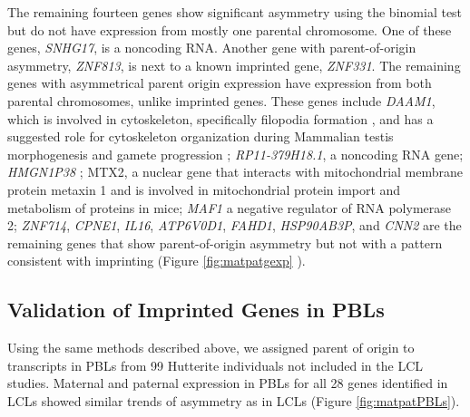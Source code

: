 The remaining fourteen genes show significant asymmetry using the binomial test but do not have expression from mostly one parental chromosome. One of these genes, \emph{SNHG17}, is a noncoding RNA. Another gene with parent-of-origin asymmetry,  \emph{ZNF813}, is next to a known imprinted gene, \emph{ZNF331}. The remaining genes with asymmetrical parent origin expression have expression from both parental chromosomes, unlike imprinted genes. These genes include  \emph{DAAM1},  which is involved in cytoskeleton, specifically filopodia formation \citep{Hoffmann:2014ki, Luo:2016db}, and has a suggested role for cytoskeleton organization during Mammalian testis morphogenesis and gamete progression \citep{Pariante:2016kn};  \emph{RP11-379H18.1}, a noncoding RNA gene;  \emph{HMGN1P38} \citep{StrichmanAlmashanu:2003cw}; MTX2, a nuclear gene that interacts with mitochondrial membrane protein metaxin 1 and is involved in mitochondrial protein import and metabolism of proteins in mice;   \emph{MAF1} a negative regulator of RNA polymerase 2;  \emph{ZNF714},  \emph{CPNE1},  \emph{IL16},  \emph{ATP6V0D1},  \emph{FAHD1},  \emph{HSP90AB3P}, and  \emph{CNN2} are the remaining genes that show parent-of-origin asymmetry but not with a pattern consistent with imprinting (Figure \ref{fig:matpatgexp} ).

\subsection{Validation of Imprinted Genes in PBLs}\label{Validation of Imprinted Genes in PBLs}
Using the same methods described above, we assigned parent of origin to transcripts in PBLs from 99 Hutterite individuals not included in the LCL studies. Maternal and paternal expression in PBLs for all 28 genes identified in LCLs showed similar trends of asymmetry as in LCLs (Figure \ref{fig:matpatPBLs}). 


